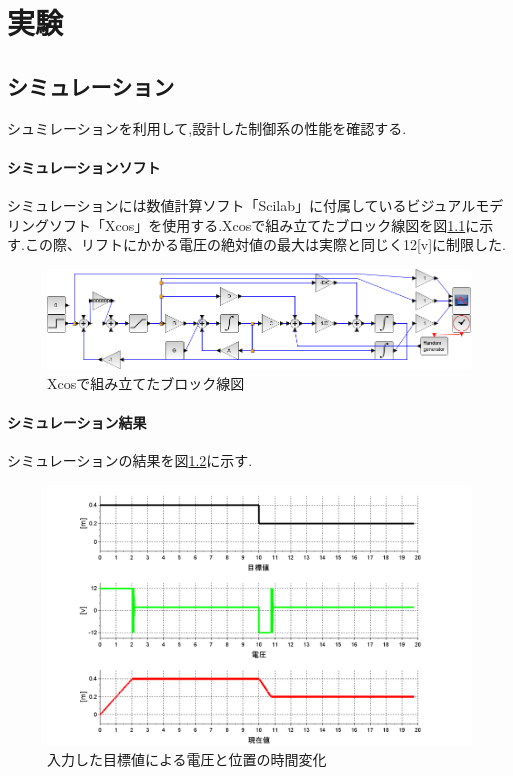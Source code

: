 \chapter{実験}
\section{シミュレーション}
シュミレーションを利用して,設計した制御系の性能を確認する.

\subsubsection{シミュレーションソフト}
シミュレーションには数値計算ソフト「Scilab」に付属しているビジュアルモデリングソフト「Xcos」を使用する.Xcosで組み立てたブロック線図を図\ref{fig:blockXcos}に示す.この際、リフトにかかる電圧の絶対値の最大は実際と同じく12[v]に制限した.

\begin{figure}[htbp]
  \begin{center}
    \includegraphics[width=150mm]{img/blockXcos.png}
    \end{center}
  \caption{Xcosで組み立てたブロック線図}
 \label{fig:blockXcos}
\end{figure}

\subsubsection{シミュレーション結果}
シミュレーションの結果を図\ref{fig:sim}に示す.

\begin{figure}[htbp]
 \begin{center}
    \includegraphics[width=150mm]{img/sim.bmp}
    \end{center}
  \caption{入力した目標値による電圧と位置の時間変化}
 \label{fig:sim}
\end{figure}

